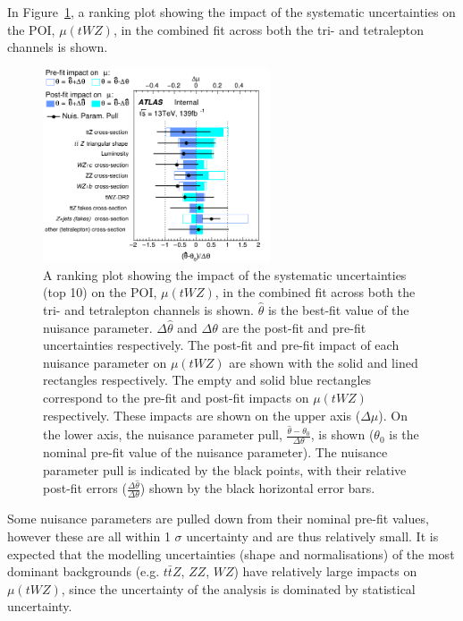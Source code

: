 In Figure~\ref{fig:4lep-combined-nuisance-ranking}, a ranking plot showing the impact of the systematic uncertainties on the POI, $\mu (tWZ)$, in the combined fit across both the tri- and tetralepton channels is shown.
\begin{figure}
    \centering
    \includegraphics[width=0.6\textwidth]{figures/combined/RankingSysts_SigXsecOverSM_systs.png}
    \caption{A ranking plot showing the impact of the systematic uncertainties (top 10) on the POI, $\mu (tWZ)$, in the combined fit across both the tri- and tetralepton channels is shown. $\hat{\theta}$ is the best-fit value of the nuisance parameter. $\Delta \hat{\theta}$ and $\Delta\theta$ are the post-fit and pre-fit uncertainties respectively. The post-fit and pre-fit impact of each nuisance parameter on $\mu (tWZ)$ are shown with the solid and lined rectangles respectively. The empty and solid blue rectangles correspond to the pre-fit and post-fit impacts on $\mu (tWZ)$ respectively. These impacts are shown on the upper axis ($\Delta \mu$). On the lower axis, the nuisance parameter pull, $\frac{\hat{\theta} - \theta_{0}}{\Delta{\theta}}$, is shown ($\theta_{0}$ is the nominal pre-fit value of the nuisance parameter). The nuisance parameter pull is indicated by the black points, with their relative post-fit errors ($\frac{\Delta \hat{\theta}}{\Delta \theta}$) shown by the black horizontal error bars.}
    \label{fig:4lep-combined-nuisance-ranking}
\end{figure}

Some nuisance parameters are pulled down from their nominal pre-fit values, however these are all within 1 $\sigma$ uncertainty and are thus relatively small. It is expected that the modelling uncertainties (shape and normalisations) of the most dominant backgrounds (e.g. $t\bar{t}Z$, $ZZ$, $WZ$) have relatively large impacts on $\mu(tWZ)$, since the uncertainty of the analysis is dominated by statistical uncertainty.


